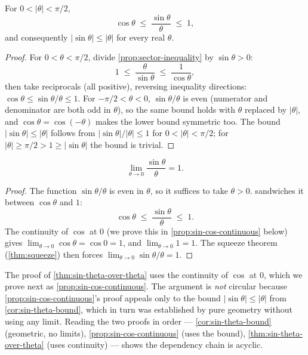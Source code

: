 \begin{corollary}\label{cor:sin-theta-bound}
For \(0 < \lvert \theta \rvert < \pi/2\),
\[
\cos \theta \;\leq\; \frac{\sin \theta}{\theta} \;\leq\; 1,
\]
and consequently \(\lvert \sin \theta \rvert \leq \lvert \theta \rvert\) for every real \(\theta\).
\end{corollary}

\begin{proof}
For \(0 < \theta < \pi/2\), divide \cref{prop:sector-inequality} by \(\sin \theta > 0\):
\[
1 \;\leq\; \frac{\theta}{\sin \theta} \;\leq\; \frac{1}{\cos \theta},
\]
then take reciprocals (all positive), reversing inequality directions: \(\cos \theta \leq \sin \theta / \theta \leq 1\). For \(-\pi/2 < \theta < 0\), \(\sin \theta / \theta\) is even (numerator and denominator are both odd in \(\theta\)), so the same bound holds with \(\theta\) replaced by \(\lvert \theta \rvert\), and \(\cos \theta = \cos(-\theta)\) makes the lower bound symmetric too. The bound \(\lvert \sin \theta \rvert \leq \lvert \theta \rvert\) follows from \(\lvert \sin \theta \rvert / \lvert \theta \rvert \leq 1\) for \(0 < \lvert \theta \rvert < \pi/2\); for \(\lvert \theta \rvert \geq \pi/2 > 1 \geq \lvert \sin \theta \rvert\) the bound is trivial.
\end{proof}

\begin{theorem}\label{thm:sin-theta-over-theta}
\[
\lim_{\theta \to 0} \frac{\sin \theta}{\theta} = 1.
\]
\end{theorem}

\begin{proof}
The function \(\sin \theta / \theta\) is even in \(\theta\), so it suffices to take \(\theta > 0\).  sandwiches it between \(\cos \theta\) and \(1\):
\[
\cos \theta \;\leq\; \frac{\sin \theta}{\theta} \;\leq\; 1.
\]
The continuity of \(\cos\) at \(0\) (we prove this in \cref{prop:sin-cos-continuous} below) gives \(\lim_{\theta \to 0} \cos \theta = \cos 0 = 1\), and \(\lim_{\theta \to 0} 1 = 1\). The squeeze theorem (\cref{thm:squeeze}) then forces \(\lim_{\theta \to 0} \sin \theta / \theta = 1\).
\end{proof}

\begin{caution}
The proof of \cref{thm:sin-theta-over-theta} uses the continuity of \(\cos\) at \(0\), which we prove next as \cref{prop:sin-cos-continuous}. The argument is \emph{not} circular because \cref{prop:sin-cos-continuous}'s proof appeals only to the bound \(\lvert \sin \theta \rvert \leq \lvert \theta \rvert\) from \cref{cor:sin-theta-bound}, which in turn was established by pure geometry without using any limit. Reading the two proofs in order --- \cref{cor:sin-theta-bound} (geometric, no limits), \cref{prop:sin-cos-continuous} (uses the bound), \cref{thm:sin-theta-over-theta} (uses continuity) --- shows the dependency chain is acyclic.
\end{caution}


